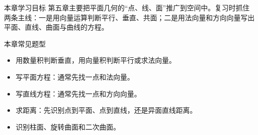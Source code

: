 
\begin{summarybox}{本章学习目标}
第五章主要把平面几何的“点、线、面”推广到空间中。复习时抓住两条主线：一是用向量运算判断平行、垂直、共面；二是用法向量和方向向量写出平面、直线、曲面与曲线的方程。
\end{summarybox}

\begin{methodbox}{本章常见题型}
\begin{itemize}
  \item 用数量积判断垂直，用向量积判断平行或求法向量。
  \item 写平面方程：通常先找一点和法向量。
  \item 写直线方程：通常先找一点和方向向量。
  \item 求距离：先识别点到平面、点到直线，还是异面直线距离。
  \item 识别柱面、旋转曲面和二次曲面。
\end{itemize}
\end{methodbox}

